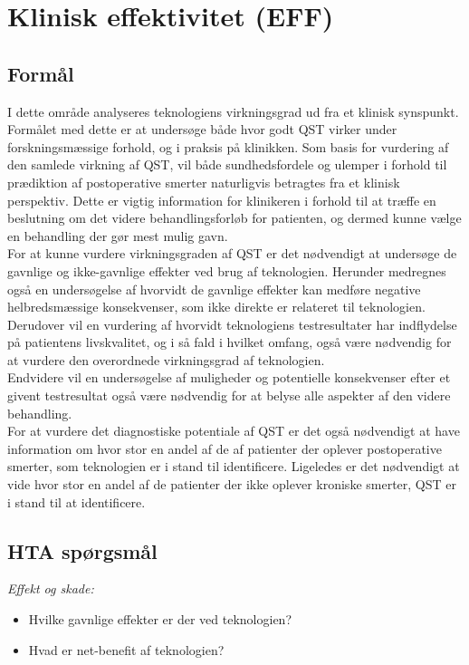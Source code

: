 \section{Klinisk effektivitet (EFF)}
\subsection{Formål}
I dette område analyseres teknologiens virkningsgrad ud fra et klinisk synspunkt. Formålet med dette er at undersøge både hvor godt QST virker under forskningsmæssige forhold, og i praksis på klinikken. Som basis for vurdering af den samlede virkning af QST, vil både sundhedsfordele og ulemper i forhold til prædiktion af postoperative smerter naturligvis betragtes fra et klinisk perspektiv. Dette er vigtig information for klinikeren i forhold til at træffe en beslutning om det videre behandlingsforløb for patienten, og dermed kunne vælge en behandling der gør mest mulig gavn.\\
For at kunne vurdere virkningsgraden af QST er det nødvendigt at undersøge de gavnlige og ikke-gavnlige effekter ved brug af teknologien. Herunder medregnes også en undersøgelse af hvorvidt de gavnlige effekter kan medføre negative helbredsmæssige konsekvenser, som ikke direkte er relateret til teknologien.\\
Derudover vil en vurdering af hvorvidt teknologiens testresultater har indflydelse på patientens livskvalitet, og i så fald i hvilket omfang, også være nødvendig for at vurdere den overordnede virkningsgrad af teknologien. \\
Endvidere vil en undersøgelse af muligheder og potentielle konsekvenser efter et givent testresultat også være nødvendig for at belyse alle aspekter af den videre behandling.\\
For at vurdere det diagnostiske potentiale af QST er det også nødvendigt at have information om hvor stor en andel af de af patienter der oplever postoperative smerter, som teknologien er i stand til identificere. Ligeledes er det nødvendigt at vide hvor stor en andel af de patienter der ikke oplever kroniske smerter, QST er i stand til at identificere.
\subsection{HTA spørgsmål} %

\textit{Effekt og skade:}
\begin{itemize}
	\item Hvilke gavnlige effekter er der ved teknologien? %
	\item Hvad er net-benefit af teknologien? %
\end{itemize}

